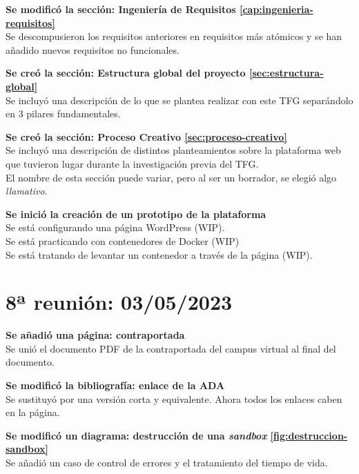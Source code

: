         \textbf{Se modificó la sección: Ingeniería de Requisitos \ref{cap:ingenieria-requisitos}} \\
        Se descompusieron los requisitos anteriores en requisitos más atómicos y se han añadido nuevos requisitos no funcionales.
    
        \textbf{Se creó la sección: Estructura global del proyecto \ref{sec:estructura-global}} \\
        Se incluyó una descripción de lo que se plantea realizar con este TFG separándolo en 3 pilares fundamentales.
    
        \textbf{Se creó la sección: Proceso Creativo \ref{sec:proceso-creativo}} \\
        Se incluyó una descripción de distintos planteamientos sobre la plataforma web que tuvieron lugar durante la investigación previa del TFG. \\
        El nombre de esta sección puede variar, pero al ser un borrador, se elegió algo \textit{llamativo}.
    
        \textbf{Se inició la creación de un prototipo de la plataforma} \\
        Se está configurando una página WordPress (WIP).\\
        Se está practicando con contenedores de Docker (WIP)\\ 
        Se está tratando de levantar un contenedor a través de la página (WIP).

        \newpage


    \section{8ª reunión: 03/05/2023}

        \textbf{Se añadió una página: contraportada} \\
        Se unió el documento PDF de la contraportada del campus virtual al final del documento.

        \textbf{Se modificó la bibliografía: enlace de la ADA \cite{articulo-ada}} \\
        Se sustituyó por una versión corta y equivalente. Ahora todos los enlaces caben en la página.

        \textbf{Se modificó un diagrama: destrucción de una \textit{sandbox} \ref{fig:destruccion-sandbox}} \\
        Se añadió un caso de control de errores y el tratamiento del tiempo de vida.

